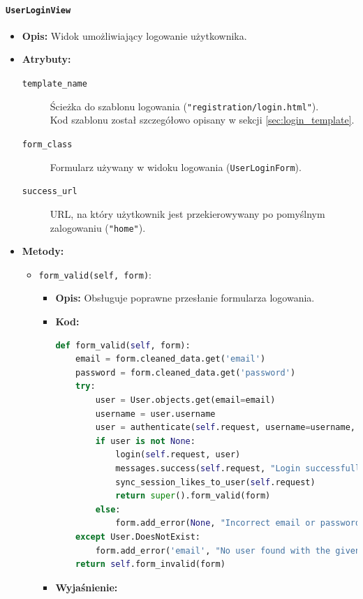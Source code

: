 \documentclass[12pt,a4paper,oneside]{article}
\theoremstyle{definition}
\numberwithin{equation}{section}
\begin{document}
\paragraph{\texttt{UserLoginView}}
\begin{itemize}
    \item \textbf{Opis:} Widok umożliwiający logowanie użytkownika.
    \item \textbf{Atrybuty:}
    \begin{description}
        \item[\texttt{template\_name}] Ścieżka do szablonu logowania (\texttt{"registration/login.html"}).\\
        \hspace{1cm} Kod szablonu został szczegółowo opisany w sekcji \ref{sec:login_template}.
        \item[\texttt{form\_class}] Formularz używany w widoku logowania (\texttt{UserLoginForm}).
        \item[\texttt{success\_url}] URL, na który użytkownik jest przekierowywany po pomyślnym zalogowaniu (\texttt{"home"}).
    \end{description}
    \item \textbf{Metody:}
    \begin{itemize}
    \item \texttt{form\_valid(self, form)}:
    \begin{itemize}
        \item \textbf{Opis:} Obsługuje poprawne przesłanie formularza logowania.
        \item \textbf{Kod:}
        \begin{lstlisting}[language=Python, caption=Metoda form\_valid w UserLoginView]
def form_valid(self, form):
    email = form.cleaned_data.get('email')
    password = form.cleaned_data.get('password')
    try:
        user = User.objects.get(email=email)
        username = user.username
        user = authenticate(self.request, username=username, password=password)
        if user is not None:
            login(self.request, user)
            messages.success(self.request, "Login successfully")
            sync_session_likes_to_user(self.request)
            return super().form_valid(form)
        else:
            form.add_error(None, "Incorrect email or password")
    except User.DoesNotExist:
        form.add_error('email', "No user found with the given email address")
    return self.form_invalid(form)
            \end{lstlisting}
            \item \textbf{Wyjaśnienie:}

\end{itemize}
\end{itemize}
\end{itemize}
\end{document}
